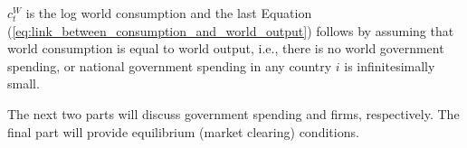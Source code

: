 $c_t^{W}$ is the log world consumption and the last Equation (\ref{eq:link_between_consumption_and_world_output}) follows by assuming that world consumption is equal to world output, i.e., there is no world government spending, or national government spending in any country $i$ is infinitesimally small.

The next two parts will discuss government spending and firms, respectively. The final part will provide equilibrium (market clearing) conditions.

